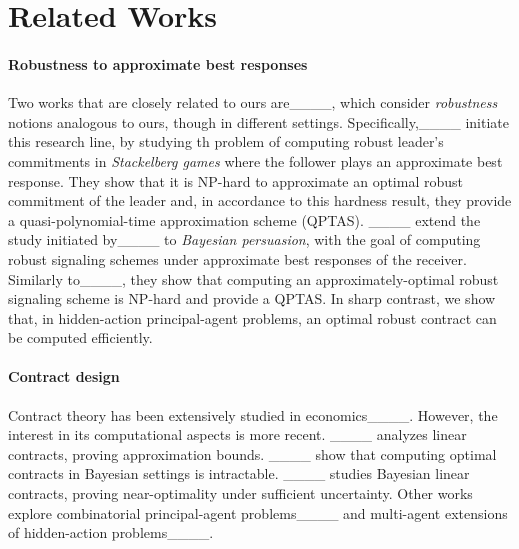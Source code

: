 \section{Related Works}
%
\paragraph{Robustness to approximate best responses} 
Two works that are closely related to ours are____, which consider \emph{robustness} notions analogous to ours, though in different settings.
%
Specifically,____ initiate this research line, by studying th problem of computing robust leader's commitments in \emph{Stackelberg games} where the follower plays an approximate best response.
%
%
They show that it is \textsf{NP}-hard to approximate an optimal robust commitment of the leader and, in accordance to this hardness result, they provide a quasi-polynomial-time approximation scheme (QPTAS).
%
____ extend the study initiated by____ to \emph{Bayesian persuasion}, with the goal of computing robust signaling schemes under approximate best responses of the receiver.
%
Similarly to____, they show that computing an approximately-optimal robust signaling scheme is \textsf{NP}-hard and provide a QPTAS.
%
In sharp contrast, we show that, in hidden-action principal-agent problems, an optimal robust contract can be computed efficiently.
%
\paragraph{Contract design} 
Contract theory has been extensively studied in economics____. 
%
However, the interest in its computational aspects is more recent. 
%
____ analyzes linear contracts, proving approximation bounds. ____ show that computing optimal contracts in Bayesian settings is intractable. 
%
____ studies Bayesian linear contracts, proving near-optimality under sufficient uncertainty. 
%
Other works explore combinatorial principal-agent problems____ and multi-agent extensions of hidden-action problems____.


